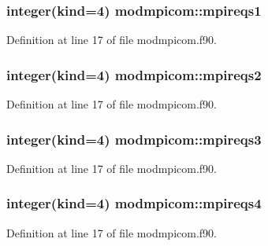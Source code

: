 \subsubsection[{\texorpdfstring{mpireqs1}{mpireqs1}}]{\setlength{\rightskip}{0pt plus 5cm}integer(kind=4) modmpicom\+::mpireqs1}\hypertarget{namespacemodmpicom_a34052e13410e6236c45dcfc1b5563200}{}\label{namespacemodmpicom_a34052e13410e6236c45dcfc1b5563200}


Definition at line 17 of file modmpicom.\+f90.

\subsubsection[{\texorpdfstring{mpireqs2}{mpireqs2}}]{\setlength{\rightskip}{0pt plus 5cm}integer(kind=4) modmpicom\+::mpireqs2}\hypertarget{namespacemodmpicom_a24670bd8507b230a6be2c2f3afabf5c1}{}\label{namespacemodmpicom_a24670bd8507b230a6be2c2f3afabf5c1}


Definition at line 17 of file modmpicom.\+f90.

\subsubsection[{\texorpdfstring{mpireqs3}{mpireqs3}}]{\setlength{\rightskip}{0pt plus 5cm}integer(kind=4) modmpicom\+::mpireqs3}\hypertarget{namespacemodmpicom_a7105e5547fa246381624c998c59249b9}{}\label{namespacemodmpicom_a7105e5547fa246381624c998c59249b9}


Definition at line 17 of file modmpicom.\+f90.

\subsubsection[{\texorpdfstring{mpireqs4}{mpireqs4}}]{\setlength{\rightskip}{0pt plus 5cm}integer(kind=4) modmpicom\+::mpireqs4}\hypertarget{namespacemodmpicom_a848fe3dd718230ed7fb98e58796619ea}{}\label{namespacemodmpicom_a848fe3dd718230ed7fb98e58796619ea}


Definition at line 17 of file modmpicom.\+f90.

